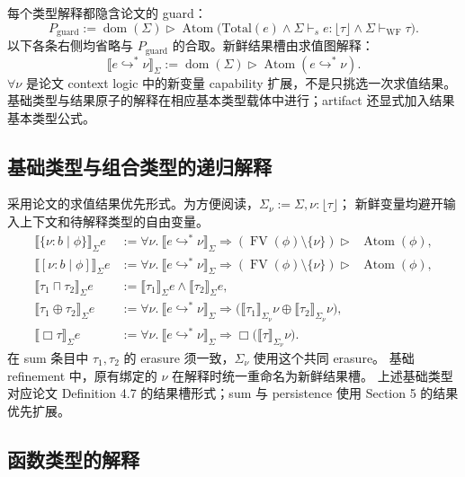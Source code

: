 \documentclass[UTF8,a4paper,11pt,fontset=fandol]{ctexart}
\newcommand{\FV}{\operatorname{FV}}
\newcommand{\dom}{\operatorname{dom}}
\newcommand{\Atom}{\operatorname{Atom}}
\newcommand{\omod}{\mathop{\boxed{\scriptstyle\mathrm{o}}}\nolimits}
\newcommand{\umod}{\mathop{\boxed{\scriptstyle\mathrm{u}}}\nolimits}
\newcommand{\oty}[2]{\{\nu:#1\mid #2\}}
\newcommand{\uty}[2]{[\nu:#1\mid #2]}
\newcommand{\Den}[1]{\llbracket #1\rrbracket}
\begin{document}
每个类型解释都隐含论文的 guard：
\[
 P_{\mathrm{guard}}:=\dom(\Sigma)\triangleright
 \Atom\bigl(\mathrm{Total}(e)\land\Sigma\vdash_s e:\lfloor\tau\rfloor
                    \land\Sigma\vdash_{\mathrm{WF}}\tau\bigr).
\]
以下各条右侧均省略与 $P_{\mathrm{guard}}$ 的合取。新鲜结果槽由求值图解释：
\[
 \Den{e\hookrightarrow^*\nu}_\Sigma
 :=\dom(\Sigma)\triangleright\Atom(e\hookrightarrow^*\nu).
\]
$\forall\nu$ 是论文 context logic 中的新变量 capability 扩展，不是只挑选一次求值结果。
基础类型与结果原子的解释在相应基本类型载体中进行；artifact 还显式加入结果基本类型公式。

\subsection{基础类型与组合类型的递归解释}

采用论文的求值结果优先形式。为方便阅读，$\Sigma_\nu:=\Sigma,\nu:\lfloor\tau\rfloor$；
新鲜变量均避开输入上下文和待解释类型的自由变量。
\begin{align}
 \Den{\oty{b}{\phi}}_\Sigma e
 &:=\forall\nu.\ \Den{e\hookrightarrow^*\nu}_\Sigma\Rightarrow
 (\FV(\phi)\setminus\{\nu\})\triangleright\omod\Atom(\phi),\label{eq:base-denote}\\
 \Den{\uty{b}{\phi}}_\Sigma e
 &:=\forall\nu.\ \Den{e\hookrightarrow^*\nu}_\Sigma\Rightarrow
 (\FV(\phi)\setminus\{\nu\})\triangleright\umod\Atom(\phi),\\
 \Den{\tau_1\sqcap\tau_2}_\Sigma e
 &:=\Den{\tau_1}_\Sigma e\land\Den{\tau_2}_\Sigma e,\\
 \Den{\tau_1\oplus\tau_2}_\Sigma e
 &:=\forall\nu.\ \Den{e\hookrightarrow^*\nu}_\Sigma\Rightarrow
 \bigl(\Den{\tau_1}_{\Sigma_\nu}\nu\oplus\Den{\tau_2}_{\Sigma_\nu}\nu\bigr),\\
 \Den{\Box\tau}_\Sigma e
 &:=\forall\nu.\ \Den{e\hookrightarrow^*\nu}_\Sigma\Rightarrow
 \Box\bigl(\Den{\tau}_{\Sigma_\nu}\nu\bigr).\label{eq:persist-type}
\end{align}
在 sum 条目中 $\tau_1,\tau_2$ 的 erasure 须一致，$\Sigma_\nu$ 使用这个共同 erasure。
基础 refinement 中，原有绑定的 $\nu$ 在解释时统一重命名为新鲜结果槽。
上述基础类型对应论文 Definition 4.7 的结果槽形式；sum 与 persistence 使用 Section 5 的结果优先扩展。

\subsection{函数类型的解释}
\end{document}
